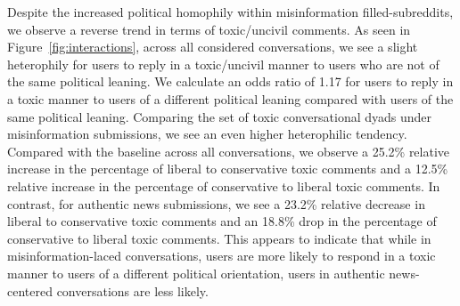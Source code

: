 Despite the increased political homophily within misinformation filled-subreddits, we observe a reverse trend in terms of toxic/uncivil comments. As seen in Figure~\ref{fig:interactions}, across all considered conversations, we see a slight heterophily for users to reply in a toxic/uncivil manner to users who are not of the same political leaning. We calculate an odds ratio of 1.17 for users to reply in a toxic manner to users of a different political leaning compared with users of the same political leaning. Comparing the set of toxic conversational dyads under misinformation submissions, we see an even higher heterophilic tendency. Compared with the baseline across all conversations, we observe a 25.2\% relative increase in the percentage of liberal to conservative toxic comments and a 12.5\% relative increase in the percentage of conservative to liberal toxic comments. In contrast, for authentic news submissions, we see a 23.2\% relative decrease in liberal to conservative toxic comments and an 18.8\% drop in the percentage of conservative to liberal toxic comments. This appears to indicate that while in misinformation-laced conversations, users are more likely to respond in a toxic manner to users of a different political orientation, users in authentic news-centered conversations are less likely.

